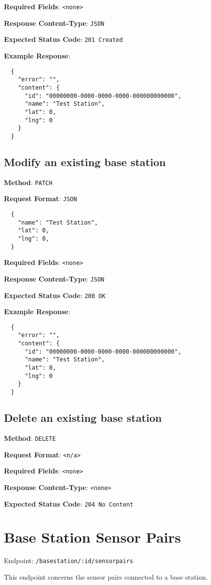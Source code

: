 \noindent
\textbf{Required Fields}: \texttt{<none>}

\noindent
\textbf{Response Content-Type}: \texttt{JSON}

\noindent
\textbf{Expected Status Code}: \texttt{201 Created}

\noindent
\textbf{Example Response}:
\begin{verbatim}
  { 
    "error": "",
    "content": {
      "id": "00000000-0000-0000-0000-000000000000",
      "name": "Test Station",
      "lat": 0,
      "lng": 0
    }
  }
\end{verbatim}


\subsection{Modify an existing base station}

\noindent
\textbf{Method}: \texttt{PATCH}

\noindent
\textbf{Request Format}: \texttt{JSON}
\begin{verbatim}
  { 
    "name": "Test Station",
    "lat": 0,
    "lng": 0,
  }
\end{verbatim}

\noindent
\textbf{Required Fields}: \texttt{<none>}

\noindent
\textbf{Response Content-Type}: \texttt{JSON}

\noindent
\textbf{Expected Status Code}: \texttt{200 OK}

\noindent
\textbf{Example Response}:
\begin{verbatim}
  { 
    "error": "",
    "content": {
      "id": "00000000-0000-0000-0000-000000000000",
      "name": "Test Station",
      "lat": 0,
      "lng": 0
    }
  }
\end{verbatim}


\subsection{Delete an existing base station}

\noindent
\textbf{Method}: \texttt{DELETE}

\noindent
\textbf{Request Format}: \texttt{<n/a>}

\noindent
\textbf{Required Fields}: \texttt{<none>}

\noindent
\textbf{Response Content-Type}: \texttt{<none>}

\noindent
\textbf{Expected Status Code}: \texttt{204 No Content}

\section{Base Station Sensor Pairs}

Endpoint: \texttt{/basestation/:id/sensorpairs}

\noindent
This endpoint concerns the sensor pairs connected to a base station.\\